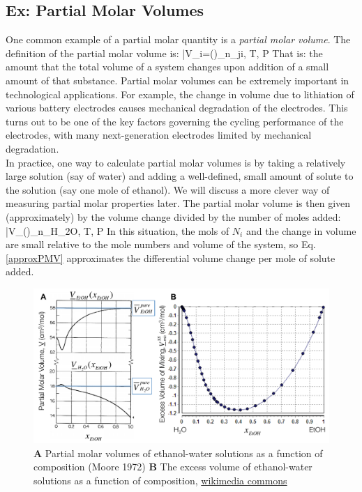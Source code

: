 \documentclass[12pt]{article}
\begin{document}
\subsection{Ex: Partial Molar Volumes}
One common example of a partial molar quantity is a \emph{partial molar volume}. The definition of the partial molar volume is: 
\eqs\bar{V}_i=\left(\right)_{n_{j\neq i}, T, P}\eqe
That is: the amount that the total volume of a system changes upon addition of a small amount of that substance. Partial molar volumes can be extremely important in technological applications. For example, the change in volume due to lithiation of various battery electrodes causes mechanical degradation of the electrodes. This turns out to be one of the key factors governing the cycling performance of the electrodes, with many next-generation electrodes limited by mechanical degradation.\\
In practice, one way to calculate partial molar volumes is by taking a relatively large solution (say of water) and adding a well-defined, small amount of solute to the solution (say one mole of ethanol). We will discuss a more clever way of measuring partial molar properties later. The partial molar volume is then given (approximately) by the volume change divided by the number of moles added:
\eqs\bar{V}_{}\simeq \left(\right)_{n_{H_2O}, T, P}
\label{approxPMV}
\eqe
In this situation, the mols of $N_i$ and the change in volume are small relative to the mole numbers and volume of the system, so Eq. \ref{approxPMV} approximates the differential volume change per mole of solute added.

\begin{figure}[h]
\centering
\includegraphics[width=13cm]{partialMolarVolumes}
\caption{\textbf{A} Partial molar volumes of ethanol-water solutions as a function of composition (Moore 1972) \textbf{B} The excess volume of ethanol-water solutions as a function of composition, \href{https://commons.wikimedia.org/wiki/File:Excess_Volume_Mixture_of_Ethanol_and_Water.png}{wikimedia commons}}
\label{PMVexamp}
\end{figure}
\end{document}
